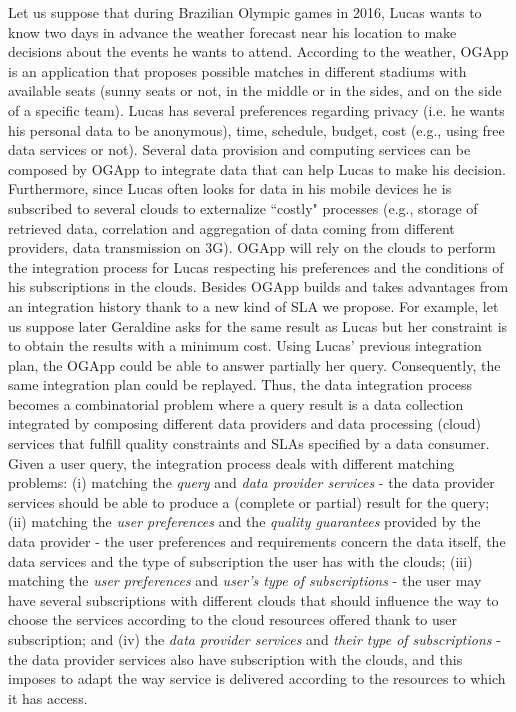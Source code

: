 Let us suppose that during Brazilian Olympic games in 2016, Lucas wants to know two days in advance the weather forecast near his  location to make decisions about the events he wants to attend. According to the weather, OGApp is an application that proposes possible matches  in different stadiums with available seats   (sunny seats or not, in the middle or in the sides, and on the side of a specific team).
%
 Lucas has several preferences regarding privacy  (i.e. he wants his personal data to be anonymous), time, schedule, budget, cost (e.g., using free data services or not). Several data provision and computing services  can be composed by OGApp to integrate data that can help Lucas to make his decision. Furthermore, since Lucas often looks for data in his mobile devices he is subscribed to several clouds to externalize ``costly"  processes (e.g., storage of retrieved data, correlation and aggregation of data coming from different providers, data transmission on 3G). 
%
OGApp will rely on the clouds to perform the integration process for Lucas respecting his preferences and the conditions of his subscriptions in the clouds. 
%
%
Besides OGApp builds and takes advantages from an integration history thank to a new kind of SLA we propose. 
For example, let us suppose later Geraldine asks for the same result as Lucas but her constraint is to obtain the results with a minimum cost. Using Lucas' previous integration plan, the OGApp could be able to answer partially her query. Consequently, the same integration plan could be replayed.
%
%
Thus, the data integration process becomes a combinatorial problem where a query result is a data collection integrated  by composing different data providers and data processing (cloud) services that fulfill quality constraints and SLAs specified by a data consumer.
Given a user query, the integration process deals with different matching problems: 
(i) matching the \textit{query} and \textit{data provider services} - the data provider services should be able to produce a (complete or partial) result for the query; 
(ii) matching the \textit{user preferences} and the \textit{quality guarantees} provided by the data provider - the user preferences and requirements concern the data itself, the data services and the type of subscription the user has with the clouds; 
(iii) matching the \textit{user preferences} and \textit{user's type of subscriptions} - the user may have several subscriptions with different clouds that should influence the way to choose the services according to the cloud resources offered thank to user subscription; and 
(iv) the \textit{data provider services} and \textit{their type of subscriptions} - the data provider services also have  subscription with the clouds, and this imposes to adapt the way service is delivered according to the resources to which it has access.

